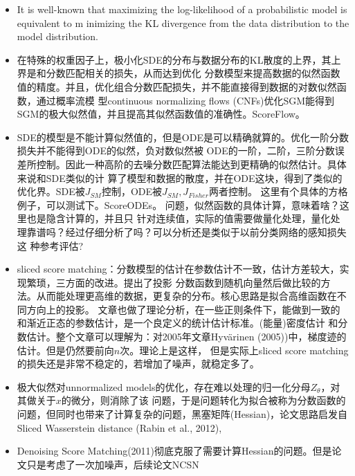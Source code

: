 \begin{itemize}
  同时假设了与 DDPM设定前向为马尔科夫性之后，推导出的逆向中条件后验分布为高斯分布 同等形式的 高斯分布。DDIM是通过
  什么，带来的推理加速(逆向采样几乎一样，多了一个$\sigma^2_{t}$，在附录C.1中说明了是通过DDPM的逆采样的子序列采样
  得到)？ 但是奇怪的是，DDIM的训练，竟然是变分去噪或者分数模型。其实差不多，这点需要代码上确认下区别。在实际中，DDIM
  的效果并不怎么样，后续的SDE均比它好很多。
  \item It is well-known that maximizing the log-likelihood of a probabilistic model is equivalent to m
  inimizing the KL divergence from the data distribution to the model distribution.
  \item 在特殊的权重因子上，极小化SDE的分布与数据分布的KL散度的上界，其上界是和分数匹配相关的损失，从而达到优化
  分数模型来提高数据的似然函数值的精度。并且，优化组合分数匹配损失，并不能直接得到数据的对数似然函数，通过概率流模
  型continuous normalizing flows (CNFs)优化SGM能得到SGM的极大似然值，并且提高其似然函数值的准确性。ScoreFlow。
  \item SDE的模型是不能计算似然值的，但是ODE是可以精确就算的。优化一阶分数损失并不能得到ODE的似然，负对数似然被
  ODE的一阶，二阶，三阶分数误差所控制。因此一种高阶的去噪分数匹配算法能达到更精确的似然估计。具体来说和SDE类似的计
  算了模型和数据的散度，并在ODE这块，得到了类似的优化界。SDE被$J_{SM}$控制，ODE被$J_{SM}, J_{Fisher}$两者控制。
  这里有个具体的方格例子，可以测试下。ScoreODEs。 问题，似然函数的具体计算，意味着啥？这里也是隐含计算的，并且只
  针对连续值，实际的值需要做量化处理，量化处理靠谱吗？经过仔细分析了吗？可以分析还是类似于以前分类网络的感知损失这
  种参考评估?
  \item sliced  score matching：分数模型的估计在参数估计不一致，估计方差较大，实现繁琐，三方面的改进。提出了投影
  分数函数到随机向量然后做比较的方法。从而能处理更高维的数据，更复杂的分布。核心思路是拟合高维函数在不同方向上的投影。
  文章也做了理论分析，在一些正则条件下，能做到一致的和渐近正态的参数估计，是一个良定义的统计估计标准。(能量)密度估计
  和分数估计。整个文章可以理解为：对2005年文章Hyvärinen (2005))中，梯度迹的估计。但是仍然要前向$n$次。理论上是这样，
  但是实际上sliced  score matching的损失还是非常不稳定的，若增加了噪声，就稳定多了。
  \item 极大似然对unnormalized  models的优化，存在难以处理的归一化分母$Z_\theta$，对其做关于$x$的微分，则消除了该
  问题，于是问题转化为拟合被称为分数函数的问题，但同时也带来了计算复杂的问题，黑塞矩阵(Hessian)，论文思路启发自
  Sliced Wasserstein distance (Rabin et al., 2012),
  \item Denoising Score Matching(2011)彻底克服了需要计算Hessian的问题。但是论文只是考虑了一次加噪声，后续论文NCSN

\end{itemize}
